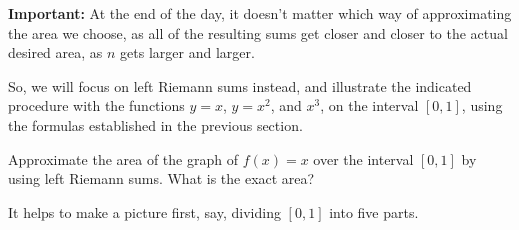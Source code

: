 \documentclass[nooutcomes]{ximera}
\begin{document}
\begin{callout}
 {\bf Important:} At the end of the day, it doesn't matter which way of approximating the area we choose, as all of the resulting sums get closer and closer to the actual desired area, as $n$ gets larger and larger.  
\end{callout}

So, we will focus on left Riemann sums instead, and illustrate the indicated procedure with the functions $y=x$, $y=x^2$, and $x^3$, on the interval $[0,1]$, using the formulas established in the previous section.

\begin{example}
  Approximate the area of the graph of $f(x) = x$ over the interval $[0,1]$ by using left Riemann sums. What is the exact area?


  \begin{explanation}
    It helps to make a picture first, say, dividing $[0,1]$ into five parts.

    \begin{image}
\end{image}



\end{explanation}
\end{example}
\end{document}
